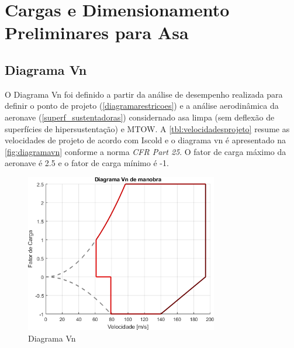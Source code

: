 \chapter{Cargas e Dimensionamento Preliminares para Asa}

\section{Diagrama Vn}
\label{diagramavn}

O Diagrama Vn foi definido a partir da análise de desempenho realizada para definir o ponto de projeto (\autoref{diagramarestricoes}) e a análise aerodinâmica da aeronave (\autoref{superf_sustentadoras}) considernado asa limpa (sem deflexão de superfícies de hipersustentação) e MTOW. A \autoref{tbl:velocidadesprojeto} resume as velocidades de projeto de acordo com Iscold \cite{iscold} e o diagrama vn é apresentado na \autoref{fig:diagramavn} conforme a norma \textit{CFR Part 25}. O fator de carga máximo da aeronave é 2.5 e o fator de carga mínimo é -1.

\begin{figure}[H]
\centering
\includegraphics[width=0.75\textwidth]{images/parte3/diagramavn_asalimpa.png}
\caption[Diagrama Vn]{Diagrama Vn}
\label{fig:diagramavn}
\end{figure}

